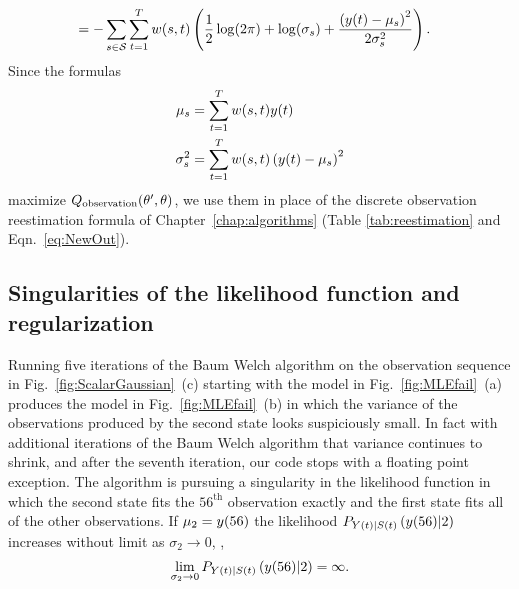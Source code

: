 \begin{description}
\begin{align}
  \label{eq:QoutG3}
  &= - \sum_{s\in\states} \sum_{t=1}^T w(s,t) \left( \frac{1}{2}
    \log(2\pi) + \log(\sigma_s) + \frac{\left( \ti{y}{t}-\mu_s
      \right)^2}{2\sigma_s^2} \right).
\end{align}
Since the formulas
\begin{align}
  \label{eq:NewMuG}
  \mu_s &= \sum_{t=1}^T w(s,t) {y}{(t)} \\
  \sigma_s^2 &= \sum_{t=1}^T w(s,t)\left( {y}{(t)}-\mu_s \right)^2
\end{align}
maximize $Q_{\text{observation}} (\theta',\theta)$, we use them in place
of the discrete observation reestimation formula of
Chapter~\ref{chap:algorithms} (Table \ref{tab:reestimation} and
Eqn.~\eqref{eq:NewOut}).
%
\end{description}


\subsection{Singularities of the likelihood function and regularization}
\label{sec:regularization}

Running five iterations of the Baum Welch algorithm on the observation
sequence in Fig.~\ref{fig:ScalarGaussian}~(c) starting with the model
in Fig.~\ref{fig:MLEfail}~(a) produces the model in
Fig.~\ref{fig:MLEfail}~(b) in which the variance of the observations
produced by the second state looks suspiciously small.  In fact with
additional iterations of the Baum Welch algorithm that variance
continues to shrink, and after the seventh iteration, our code stops
with a floating point exception.  The algorithm is pursuing a
singularity in the likelihood function in which the second state fits
the $56^{\text{th}}$ observation exactly and the first state fits all
of the other observations.  If $\mu_2 = {y}{(56)}$ the likelihood
$P_{{Y}{(t)}|{S}{(t)}} \left({y}{(56)}|2 \right)$ increases without
limit as $\sigma_2 \rightarrow 0$, \ie,
\begin{equation*}
  \lim_{\sigma_2 \rightarrow 0} P_{{Y}{(t)}|{S}{(t)}}
  \left({y}{(56)}|2 \right) = \infty.
\end{equation*}

